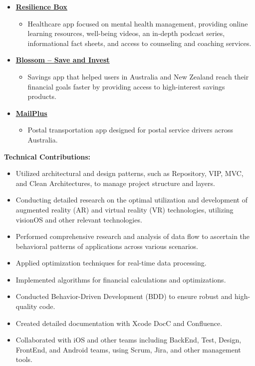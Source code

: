 \documentclass[letter,10pt]{article}
\newcommand{\customsquare}{\raisebox{0.25ex}{\scalebox{0.45}{$\blacksquare$}}}
\begin{document}
\begin{itemize}[label={\customsquare}]    
    \item \href{https://app.resiliencebox.com}{\underline{\textbf{Resilience Box}}}
    \begin{itemize}
        \item Healthcare app focused on mental health management, providing online learning resources, well-being videos, an in-depth podcast series, informational fact sheets, and access to counseling and coaching services.
    \end{itemize}

    \item \href{https://www.blossomapp.com}{\underline{\textbf{Blossom -- Save and Invest}}}
    \begin{itemize}
        \item Savings app that helped users in Australia and New Zealand reach their financial goals faster by providing access to high-interest savings products.
    \end{itemize}
    
    \item \href{https://mailplus.com.au}{\underline{\textbf{MailPlus}}}
    \begin{itemize}
        \item Postal transportation app designed for postal service drivers across Australia.
    \end{itemize}
\end{itemize}

\newpage

\textbf{Technical Contributions:}
\begin{itemize}[label={\customsquare}]
    \item Utilized architectural and design patterns, such as Repository, VIP, MVC, and Clean Architectures, to manage project structure and layers.
    \item Conducting detailed research on the optimal utilization and development of augmented reality (AR) and virtual reality (VR) technologies, utilizing visionOS and other relevant technologies.
    \item Performed comprehensive research and analysis of data flow to ascertain the behavioral patterns of applications across various scenarios.
    \item Applied optimization techniques for real-time data processing.
    \item Implemented algorithms for financial calculations and optimizations.
    \item Conducted Behavior-Driven Development (BDD) to ensure robust and high-quality code.
    \item Created detailed documentation with Xcode DocC and Confluence.
    \item Collaborated with iOS and other teams including BackEnd, Test, Design, FrontEnd, and Android teams, using Scrum, Jira, and other management tools.
\end{itemize}
\end{document}
